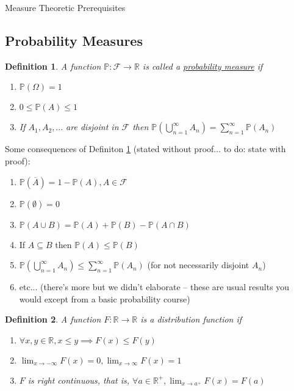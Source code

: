 \documentclass[12pt]{article}
\newtheorem{definition}{Definition}
\begin{document}
\begin{section}{Measure Theoretic Prerequisites}
\subsection{Probability Measures}

\begin{definition} \label{def:probmeasure} A function $\mathbb P : \mathcal F \rightarrow \mathbb R$ is called a \underline{probability measure} if
\begin{enumerate}
	\item $\mathbb P(\Omega) = 1$
	\item $0 \leq \mathbb P(A) \leq 1$
	\item If $A_1, A_2, ...$ are disjoint in $\mathcal F$ then $\mathbb P(\bigcup^{\infty}_{n = 1} A_n) = \sum^\infty_{n = 1} \mathbb P(A_n)$
\end{enumerate}
\end{definition}

\noindent Some consequences of Definiton \ref{def:probmeasure} (stated without proof... to do: state with proof):
\begin{enumerate}
	\item $\mathbb P(\overline{A}) = 1 - \mathbb P(A), A \in \mathcal F$
	\item $\mathbb P(\emptyset) = 0$
	\item $\mathbb P(A \cup B) = \mathbb P(A) + \mathbb P(B) - \mathbb P(A \cap B)$
	\item If $A \subseteq B$ then $\mathbb P(A) \leq \mathbb P(B)$
	\item $\mathbb P(\bigcup^\infty_{n = 1} A_n) \leq \sum^\infty_{n = 1}\mathbb P(A_n)$ (for not necessarily disjoint $A_n$)
	\item etc... (there's more but we didn't elaborate -- these are usual results you would except from a basic probability course)
\end{enumerate}

\begin{definition} \label{def:distributionfxn} A function $F: \mathbb R \rightarrow \mathbb R$ is a distribution function if
\begin{enumerate}
	\item $\forall x,y \in \mathbb R, x \leq y \implies F(x) \leq F(y)$
	\item $\lim_{x\to -\infty} F(x) = 0, \lim_{x\to \infty} F(x) = 1$
	\item $F$ is right continuous, that is, $\forall a \in \mathbb R^+, \lim_{x\to a^+} F(x) = F(a)$
\end{enumerate}
\end{definition}


\end{section}
\end{document}
